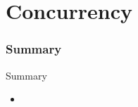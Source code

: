 \part[Concurrency]{Concurrency}



\section{Summary}
\begin{frame}{Summary}
\begin{itemize}
  \item
\end{itemize}
\end{frame}